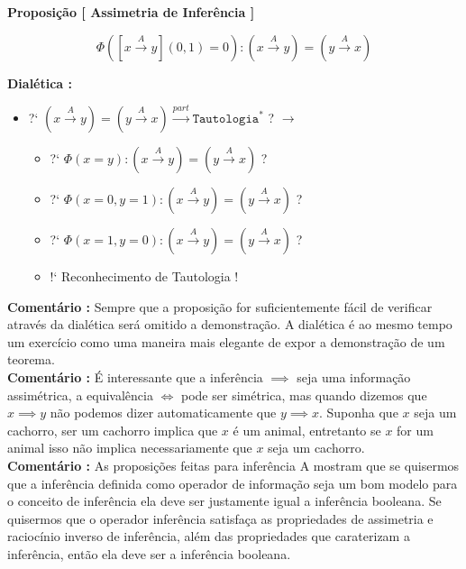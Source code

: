\documentclass[10pt,a4paper]{report}
\begin{document}
\textbf{Proposição [ Assimetria de Inferência ]}


$$ \Phi( [ x \overset{A}{\rightarrow} y ](0,1) = 0 ) : ( x \overset{A}{\rightarrow} y ) = ( y \overset{A}{\rightarrow} x ) $$

\textbf{Dialética :} 

\begin{itemize}
	\item[ ] ?` $ ( x \overset{A}{\rightarrow} y ) = ( y \overset{A}{\rightarrow} x ) \overset{part}{\rightarrow} \texttt{Tautologia}^* $  ? $\rightarrow$
	\begin{itemize}
		\item[ ] ?` $ \Phi( x=y ) : ( x \overset{A}{\rightarrow} y ) = ( y \overset{A}{\rightarrow} x )  $ ?
		\item[ ] ?` $ \Phi( x=0, y=1 ) : ( x \overset{A}{\rightarrow} y ) = ( y \overset{A}{\rightarrow} x ) $   ?
		\item[ ] ?` $ \Phi( x=1, y=0 ) : ( x \overset{A}{\rightarrow} y ) = ( y \overset{A}{\rightarrow} x ) $  ?
		\item[ ] !` Reconhecimento de Tautologia !
	\end{itemize}
\end{itemize}

\textbf{Comentário :} Sempre que a proposição for suficientemente fácil de verificar através da dialética será omitido a demonstração. A dialética é ao mesmo tempo um exercício como uma maneira mais elegante de expor a demonstração de um teorema. \\

\textbf{Comentário :} É interessante que a inferência $\implies$ seja uma informação assimétrica, a equivalência $\iff$ pode ser simétrica, mas quando dizemos que $x\implies y$ não podemos dizer automaticamente que $y \implies x$. Suponha que $x$ seja um cachorro, ser um cachorro implica que $x$ é um animal, entretanto se $x$ for um animal isso não implica necessariamente que $x$ seja um cachorro.\\

\textbf{Comentário :} As proposições feitas para inferência A mostram que se quisermos que a inferência definida como operador de informação seja um bom modelo para o conceito de inferência ela deve ser justamente igual a inferência booleana. Se quisermos que o operador inferência satisfaça as propriedades de assimetria e raciocínio inverso de inferência, além das propriedades que caraterizam a inferência, então ela deve ser a inferência booleana.
\end{document}
